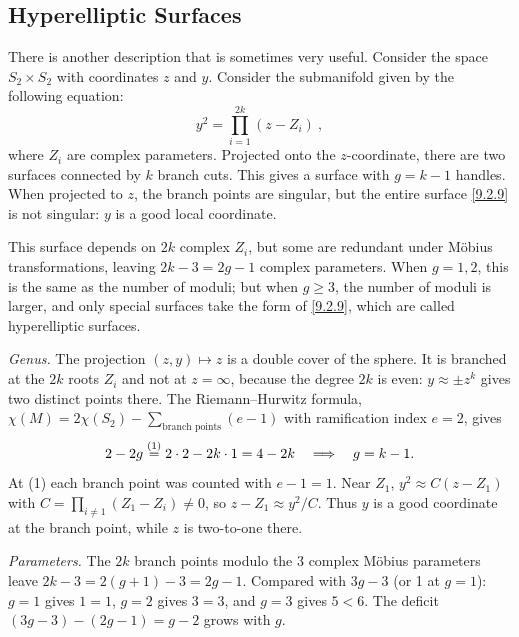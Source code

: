 \subsection*{Hyperelliptic Surfaces}

There is another description that is sometimes very useful.
Consider the space $S_{2} \times S_{2}$ with coordinates $z$ and $y$. Consider the submanifold given by the following equation:
\begin{equation}
	y^{2}=\prod_{i=1}^{2 k}(z-Z_{i}) \:, \label{9.2.9}
\end{equation}
where $Z_{i}$ are complex parameters. Projected onto the $z$-coordinate, there are two surfaces connected by $k$ branch cuts.
This gives a surface with $g=k-1$ handles. When projected to $z$, the branch points are singular, 
but the entire surface \eqref{9.2.9} is not singular: $y$ is a good local coordinate.

This surface depends on $2k$ complex $Z_{i}$, but some are redundant under Möbius transformations, leaving $2k-3=2g-1$ complex parameters. When $g=1,2$, this is the same as the number of moduli;
but when $g \geq 3$, the number of moduli is larger, and only special surfaces take the form of \eqref{9.2.9}, which are called hyperelliptic surfaces.
\begin{tcolorbox}[breakable]
	\begin{remark}
		\emph{Genus.} The projection $(z,y)\mapsto z$ is a double cover of the sphere. It is branched at the $2k$ roots $Z_i$ and not at $z=\infty$, because the degree $2k$ is even: $y\approx\pm z^k$ gives two distinct points there. The Riemann--Hurwitz formula, $\chi(M)=2\chi(S_2)-\sum_{\text{branch points}}(e-1)$ with ramification index $e=2$, gives
		\begin{equation*}
			2-2g\overset{(1)}{=}2\cdot2-2k\cdot1=4-2k\quad\Longrightarrow\quad g=k-1 .
		\end{equation*}
		At (1) each branch point was counted with $e-1=1$. Near $Z_1$, $y^2\approx C(z-Z_1)$ with $C=\prod_{i\ne1}(Z_1-Z_i)\ne0$, so $z-Z_1\approx y^2/C$. Thus $y$ is a good coordinate at the branch point, while $z$ is two-to-one there.

		\emph{Parameters.} The $2k$ branch points modulo the 3 complex M\"obius parameters leave $2k-3=2(g+1)-3=2g-1$. Compared with $3g-3$ (or 1 at $g=1$): $g=1$ gives $1=1$, $g=2$ gives $3=3$, and $g=3$ gives $5<6$. The deficit $(3g-3)-(2g-1)=g-2$ grows with $g$.
	\end{remark}
\end{tcolorbox}

